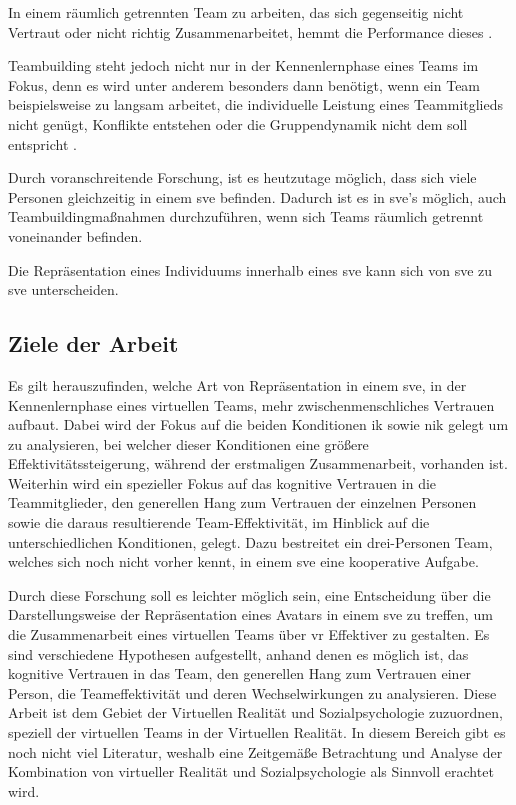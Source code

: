 \documentclass[a4paper,11pt]{article}%
\renewcommand{\\}{\vspace*{0.5\baselineskip} \newline}
\begin{document}
	In einem räumlich getrennten Team zu arbeiten, das sich gegenseitig nicht Vertraut oder nicht richtig Zusammenarbeitet, hemmt die Performance dieses \citep[p. 98-107]{huang1998supporting} \citep[p. 399-417]{turoff1993distributed}.
	
	Teambuilding steht jedoch nicht nur in der Kennenlernphase eines Teams im Fokus, denn es wird unter anderem besonders dann benötigt, wenn ein Team beispielsweise zu langsam arbeitet, die individuelle Leistung eines Teammitglieds nicht genügt, Konflikte entstehen oder die Gruppendynamik nicht dem soll entspricht \citep[p. 1-3]{biech2007pfeiffer}.
	
	Durch voranschreitende Forschung, ist es heutzutage möglich, dass sich viele Personen gleichzeitig in einem \ac{sve} befinden. Dadurch ist es in \ac{sve}'s möglich, auch Teambuildingmaßnahmen durchzuführen, wenn sich Teams räumlich getrennt voneinander befinden.
	
	Die Repräsentation eines Individuums innerhalb eines \ac{sve} kann sich von \ac{sve} zu \ac{sve} unterscheiden.
	
	\subsection{Ziele der Arbeit}
Es gilt herauszufinden, welche Art von Repräsentation in einem \ac{sve}, in der \dq{}Kennenlernphase\dq{} eines virtuellen Teams, mehr zwischenmenschliches Vertrauen aufbaut. Dabei wird der Fokus auf die beiden Konditionen \ac{ik} sowie \ac{nik} gelegt um zu analysieren, bei welcher dieser Konditionen eine größere Effektivitätssteigerung, während der erstmaligen Zusammenarbeit, vorhanden ist.
Weiterhin wird ein spezieller Fokus auf das kognitive Vertrauen in die Teammitglieder, den generellen Hang zum Vertrauen der einzelnen Personen sowie die daraus resultierende Team-Effektivität, im Hinblick auf die unterschiedlichen Konditionen, gelegt. Dazu bestreitet ein drei-Personen Team, welches sich noch nicht vorher kennt, in einem \ac{sve} eine kooperative Aufgabe.

	Durch diese Forschung soll es leichter möglich sein, eine Entscheidung über die Darstellungsweise der Repräsentation eines Avatars in einem \ac{sve} zu treffen, um die Zusammenarbeit eines virtuellen Teams über \ac{vr} Effektiver zu gestalten.
	Es sind verschiedene Hypothesen aufgestellt, anhand denen es möglich ist, das kognitive Vertrauen in das Team, den generellen Hang zum Vertrauen einer Person, die Teameffektivität und deren Wechselwirkungen zu analysieren.
	Diese Arbeit ist dem Gebiet der Virtuellen Realität und Sozialpsychologie zuzuordnen, speziell der virtuellen Teams in der Virtuellen Realität.
	In diesem Bereich gibt es noch nicht viel Literatur, weshalb eine Zeitgemäße Betrachtung und Analyse der Kombination von virtueller Realität und Sozialpsychologie als Sinnvoll erachtet wird.
\end{document}

